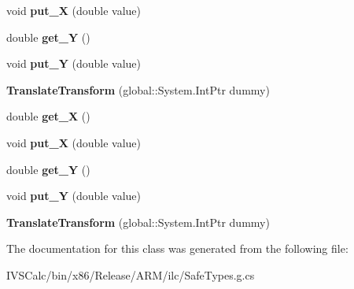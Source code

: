 \begin{DoxyCompactItemize}
\mbox{\label{class_windows_1_1_u_i_1_1_xaml_1_1_media_1_1_translate_transform_a882a802a246d539dceb8db566c78edaf}} 
void {\bfseries put\+\_\+X} (double value)
\item 
\mbox{\label{class_windows_1_1_u_i_1_1_xaml_1_1_media_1_1_translate_transform_acc7fae249e38b4c70dc8983107de11fe}} 
double {\bfseries get\+\_\+Y} ()
\item 
\mbox{\label{class_windows_1_1_u_i_1_1_xaml_1_1_media_1_1_translate_transform_a86009b9ae7b7c196544226eb9aa51e52}} 
void {\bfseries put\+\_\+Y} (double value)
\item 
\mbox{\label{class_windows_1_1_u_i_1_1_xaml_1_1_media_1_1_translate_transform_acf407460a33622528d11331cc01be35e}} 
{\bfseries Translate\+Transform} (global\+::\+System.\+Int\+Ptr dummy)
\item 
\mbox{\label{class_windows_1_1_u_i_1_1_xaml_1_1_media_1_1_translate_transform_ac354107d48db96cde24d347cc8d1eac1}} 
double {\bfseries get\+\_\+X} ()
\item 
\mbox{\label{class_windows_1_1_u_i_1_1_xaml_1_1_media_1_1_translate_transform_a882a802a246d539dceb8db566c78edaf}} 
void {\bfseries put\+\_\+X} (double value)
\item 
\mbox{\label{class_windows_1_1_u_i_1_1_xaml_1_1_media_1_1_translate_transform_acc7fae249e38b4c70dc8983107de11fe}} 
double {\bfseries get\+\_\+Y} ()
\item 
\mbox{\label{class_windows_1_1_u_i_1_1_xaml_1_1_media_1_1_translate_transform_a86009b9ae7b7c196544226eb9aa51e52}} 
void {\bfseries put\+\_\+Y} (double value)
\item 
\mbox{\label{class_windows_1_1_u_i_1_1_xaml_1_1_media_1_1_translate_transform_acf407460a33622528d11331cc01be35e}} 
{\bfseries Translate\+Transform} (global\+::\+System.\+Int\+Ptr dummy)
\end{DoxyCompactItemize}


The documentation for this class was generated from the following file\+:\begin{DoxyCompactItemize}
\item 
I\+V\+S\+Calc/bin/x86/\+Release/\+A\+R\+M/ilc/Safe\+Types.\+g.\+cs\end{DoxyCompactItemize}
